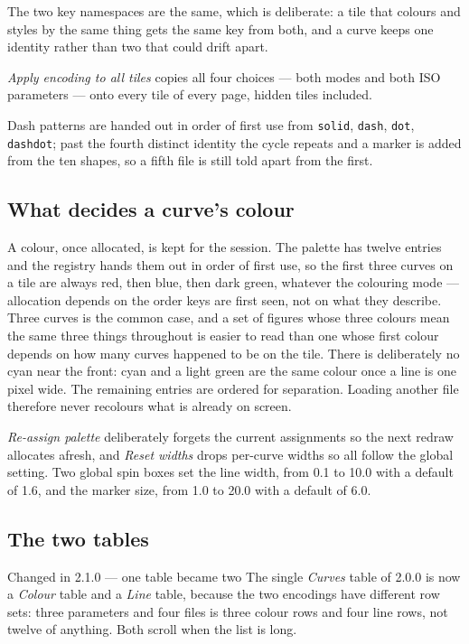 \documentclass[11pt,a4paper,oneside]{report}
\newcommand{\code}[1]{\texttt{#1}}
\begin{document}
The two key namespaces are the same, which is deliberate: a tile that colours and
styles by the same thing gets the same key from both, and a curve keeps one
identity rather than two that could drift apart.

\emph{Apply encoding to all tiles} copies all four choices --- both modes and
both ISO parameters --- onto every tile of every page, hidden tiles included.

Dash patterns are handed out in order of first use from \code{solid},
\code{dash}, \code{dot}, \code{dashdot}; past the fourth distinct identity the
cycle repeats and a marker is added from the ten shapes, so a fifth file is
still told apart from the first.

\subsection{What decides a curve's colour}

A colour, once allocated, is kept for the session. The palette has twelve entries
and the registry hands them out in order of first use, so the first three curves
on a tile are always red, then blue, then dark green, whatever the colouring mode
--- allocation depends on the order keys are first seen, not on what they
describe. Three curves is the common case, and a set of figures whose three
colours mean the same three things throughout is easier to read than one whose
first colour depends on how many curves happened to be on the tile. There is
deliberately no cyan near the front: cyan and a light green are the same colour
once a line is one pixel wide. The remaining entries are ordered for separation.
Loading another file therefore never recolours what is already on screen.

\emph{Re-assign palette} deliberately forgets the current assignments so the next
redraw allocates afresh, and \emph{Reset widths} drops per-curve widths so all
follow the global setting. Two global spin boxes set the line width, from 0.1 to
10.0 with a default of 1.6, and the marker size, from 1.0 to 20.0 with a default
of 6.0.

\subsection{The two tables}

\begin{aoenew}{Changed in 2.1.0 --- one table became two}
The single \emph{Curves} table of 2.0.0 is now a \emph{Colour} table and a
\emph{Line} table, because the two encodings have different row sets: three
parameters and four files is three colour rows and four line rows, not twelve of
anything. Both scroll when the list is long.
\end{aoenew}
\end{document}
